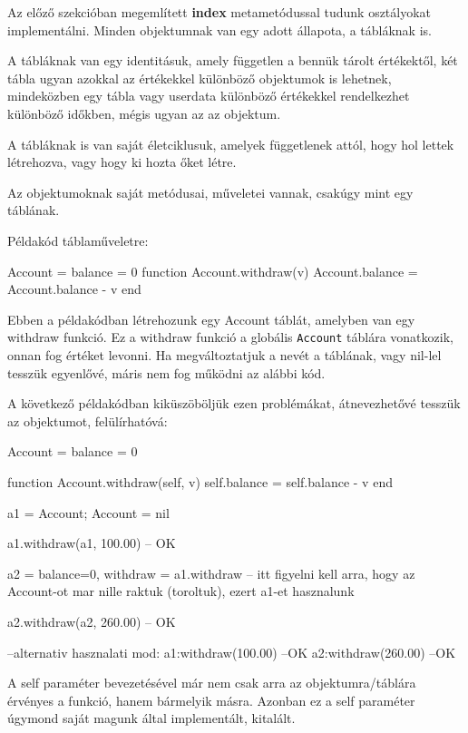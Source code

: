 \pagebreak


Az előző szekcióban megemlített \detokenize{__}\textbf{index} metametódussal tudunk osztályokat implementálni. Minden objektumnak van egy adott állapota, a tábláknak is.

A tábláknak van egy identitásuk, amely független a bennük tárolt értékektől, két tábla ugyan azokkal az értékekkel különböző objektumok is lehetnek, mindeközben egy tábla vagy userdata különböző értékekkel rendelkezhet különböző időkben, mégis ugyan az az objektum.

A tábláknak is van saját életciklusuk, amelyek függetlenek attól, hogy hol lettek létrehozva, vagy hogy ki hozta őket létre.

Az objektumoknak saját metódusai, műveletei vannak, csakúgy mint egy táblának.

Példakód táblaműveletre:
\begin{lua}
Account = {balance = 0}
function Account.withdraw(v)
	Account.balance = Account.balance - v
end
\end{lua}
Ebben a példakódban létrehozunk egy Account táblát, amelyben van egy withdraw funkció. Ez a withdraw funkció a globális \texttt{Account} táblára vonatkozik, onnan fog értéket levonni. Ha megváltoztatjuk a nevét a táblának, vagy nil-lel tesszük egyenlővé, máris nem fog működni az alábbi kód.

A következő példakódban kiküszöböljük ezen problémákat, átnevezhetővé tesszük az objektumot, felülírhatóvá:

\begin{lua}
Account = {balance = 0}

function Account.withdraw(self, v)
	self.balance = self.balance - v
end 

a1 = Account; Account = nil

a1.withdraw(a1, 100.00)   -- OK

a2 = {balance=0, withdraw = a1.withdraw} -- itt figyelni kell arra, hogy az Account-ot mar nille raktuk (toroltuk), ezert a1-et hasznalunk 

a2.withdraw(a2, 260.00) -- OK

--alternativ hasznalati mod:
a1:withdraw(100.00) --OK
a2:withdraw(260.00) --OK
\end{lua}

A self paraméter bevezetésével már nem csak arra az objektumra/táblára érvényes a funkció, hanem bármelyik másra. Azonban ez a self paraméter úgymond saját magunk által implementált, kitalált.

